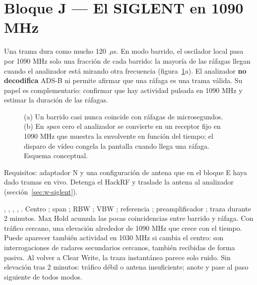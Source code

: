 \section{Bloque J --- El SIGLENT en 1090 MHz}
\label{sec:u-siglent}

\begin{importante}
Una trama dura como mucho 120~$\mu$s. En modo barrido, el oscilador local pasa por 1090 MHz solo una fracción de cada barrido: la mayoría de las ráfagas llegan cuando el analizador está mirando otra frecuencia (figura~\ref{fig:barrido}a). El analizador \textbf{no decodifica} ADS-B ni permite afirmar que una ráfaga es una trama válida. Su papel es complementario: confirmar que hay actividad pulsada en 1090 MHz y estimar la duración de las ráfagas.
\end{importante}

\begin{figure}[H]
\centering
\resizebox{\linewidth}{!}{}
\caption{(a) Un barrido casi nunca coincide con ráfagas de microsegundos. (b) En \emph{span} cero el analizador se convierte en un receptor fijo en 1090 MHz que muestra la envolvente en función del tiempo; el disparo de vídeo congela la pantalla cuando llega una ráfaga. Esquema conceptual.}
\label{fig:barrido}
\end{figure}

Requisitos: adaptador N y una configuración de antena que en el bloque E haya dado tramas en vivo. Detenga el HackRF y traslade la antena al analizador (sección~\ref{sec:w-siglent}).

{, , , , .}
{Centro ; span ; RBW ; VBW ; referencia ; preamplificador ; traza  durante 2 minutos.}
{Max Hold acumula las pocas coincidencias entre barrido y ráfaga.}
{Con tráfico cercano, una elevación alrededor de 1090 MHz que crece con el tiempo. Puede aparecer también actividad en 1030 MHz si cambia el centro: son interrogaciones de radares secundarios cercanos, también recibidas de forma pasiva.}
{Al volver a Clear Write, la traza instantánea parece solo ruido.}
{Sin elevación tras 2 minutos: tráfico débil o antena insuficiente; anote y pase al paso siguiente de todos modos.}

